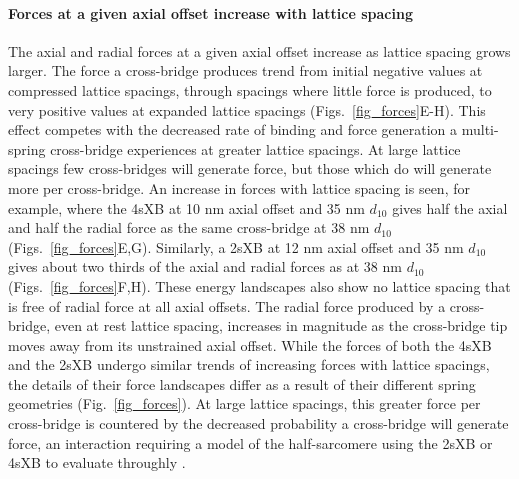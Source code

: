 \documentclass[]{article}
\begin{document}
\paragraph{Forces at a given axial offset increase with lattice spacing} %
The axial and radial forces at a given axial offset increase as lattice spacing grows larger.
The force a cross-bridge produces trend from initial negative values at compressed lattice spacings, through spacings where little force is produced, to very positive values at expanded lattice spacings (Figs.~\ref{fig_forces}E-H). 
This effect competes with the decreased rate of binding and force generation a multi-spring cross-bridge experiences at greater lattice spacings. 
At large lattice spacings few cross-bridges will generate force, but those which do will generate more per cross-bridge. 
An increase in forces with lattice spacing is seen, for example, where the 4sXB at 10 nm axial offset and 35 nm $d_{10}$ gives half the axial and half the radial force as the same cross-bridge at 38 nm $d_{10}$ (Figs.~\ref{fig_forces}E,G). 
Similarly, a 2sXB at 12 nm axial offset and 35 nm $d_{10}$ gives about two thirds of the axial and radial forces as at 38 nm $d_{10}$ (Figs.~\ref{fig_forces}F,H).  
These energy landscapes also show no lattice spacing that is free of radial force at all axial offsets.  
The radial force produced by a cross-bridge, even at rest lattice spacing, increases in magnitude as the cross-bridge tip moves away from its unstrained axial offset. 
While the forces of both the 4sXB and the 2sXB undergo similar trends of increasing forces with lattice spacings, the details of their force landscapes differ as a result of their different spring geometries (Fig.~\ref{fig_forces}). 
At large lattice spacings, this greater force per cross-bridge is countered by the decreased probability a cross-bridge will generate force, an interaction requiring a model of the half-sarcomere using the 2sXB or 4sXB to evaluate throughly \citep{Martyn2004}. 
\end{document}

